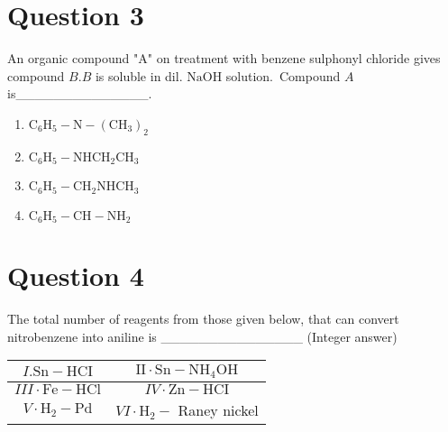 \documentclass{article}
\begin{document}
\section*{Question 3}
An organic compound "A" on treatment with benzene sulphonyl chloride gives compound \(B . B\) is soluble in dil. \(\mathrm{NaOH}\) solution. Compound \(A\) is______________. 
\begin{enumerate}[label=(\alph*)]
\item \(\mathrm{C}_6 \mathrm{H}_5-\mathrm{N}-\left(\mathrm{CH}_3\right)_2\)
\item \(\mathrm{C}_6 \mathrm{H}_5-\mathrm{NHCH}_2 \mathrm{CH}_3\)
\item \(\mathrm{C}_6 \mathrm{H}_5-\mathrm{CH}_2 \mathrm{NHCH}_3\)
\item \(\mathrm{C}_6 \mathrm{H}_5-\mathrm{CH}-\mathrm{NH}_2\)
\end{enumerate}
\newpage
\section*{Question 4}
The total number of reagents from those given below, that can convert nitrobenzene into aniline is _______________ (Integer answer)
    \setlength{\arrayrulewidth}{1mm}
    \begin{tabular}{|c|c|}
    \hline
    \(I . \mathrm{Sn}-\mathrm{HCI}\) & \(\mathrm{II} \cdot \mathrm{Sn}-\mathrm{NH}_4 \mathrm{OH}\) \\
\hline
\(I I I \cdot \mathrm{Fe}-\mathrm{HCl}\) & \(I V \cdot \mathrm{Zn}-\mathrm{HCI}\) \\
\hline
\(V \cdot \mathrm{H}_2-\mathrm{Pd}\) & \(V I \cdot \mathrm{H}_2-\) Raney nickel \\
\hline

    \end{tabular}
    \setlength{\arrayrulewidth}{0.4mm}
    
\begin{enumerate}[label=(\alph*)]
\end{enumerate}
\newpage
\end{document}
